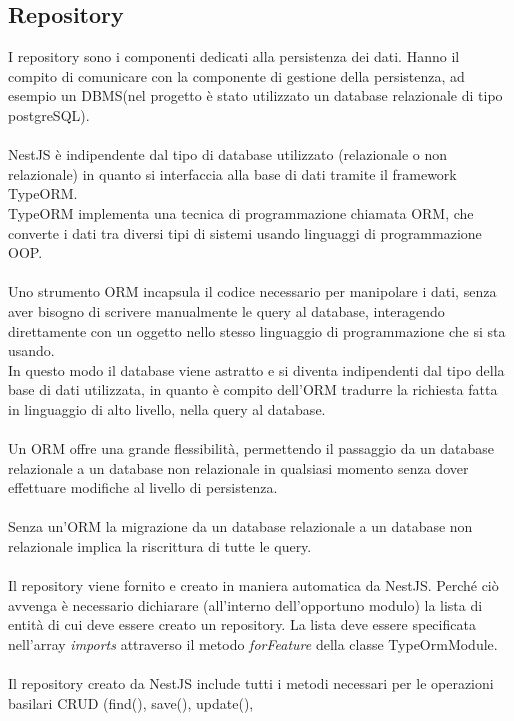 \subsection{Repository}
I repository sono i componenti dedicati alla persistenza dei dati. Hanno il compito di
comunicare con la componente di gestione della persistenza, ad esempio un \gls{DBMS}\glsfirstoccur (nel progetto è stato 
utilizzato un database
relazionale di tipo postgreSQL).
\\\\
NestJS è indipendente dal tipo di database utilizzato (relazionale o non relazionale) in quanto si interfaccia
alla base di dati tramite il framework TypeORM. 
\\
TypeORM implementa una tecnica di programmazione chiamata 
\gls{ORM}\glsfirstoccur, che converte i dati tra diversi tipi di sistemi usando linguaggi di programmazione \gls{OOP}\glsfirstoccur.
\\\\
Uno strumento \gls{ORM} incapsula il codice necessario per manipolare i dati, senza aver bisogno di scrivere manualmente
le query al database, interagendo direttamente con un oggetto nello stesso linguaggio di programmazione che si sta usando. 
\\
In questo modo il database viene astratto e si diventa indipendenti dal tipo della base di dati utilizzata, in quanto è compito dell'\gls{ORM}
tradurre la richiesta fatta in linguaggio di alto livello, nella query al database. 
\\\\
Un \gls{ORM} offre una grande flessibilità, permettendo il passaggio da un database
relazionale a un database non relazionale in qualsiasi momento senza dover effettuare modifiche al livello di persistenza.
\\\\
Senza un'\gls{ORM} la migrazione da un database relazionale a un database non relazionale implica la riscrittura di tutte le query.
\\\\
Il repository viene fornito e creato in maniera automatica da NestJS. Perché ciò avvenga è necessario
dichiarare (all'interno dell'opportuno modulo) la lista di entità di cui deve essere creato un repository.
La lista deve essere specificata nell'array \textit{imports} attraverso 
il metodo \textit{forFeature} della classe TypeOrmModule.
\\\\
Il repository creato da NestJS include tutti i metodi necessari per le operazioni basilari \gls{CRUD} (find(), save(), update(), 
